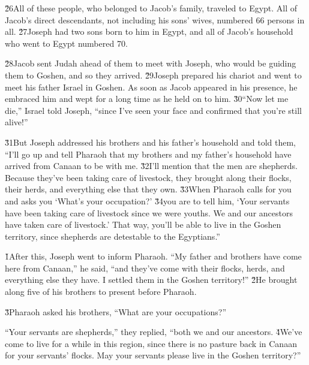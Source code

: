 \v{26}All of these people, who belonged to Jacob's family, traveled to Egypt. All of Jacob's direct descendants, not including his sons' wives, numbered 66 persons in all. \v{27}Joseph had two sons born to him in Egypt, and all of Jacob's household who went to Egypt numbered 70.

\v{28}Jacob sent Judah ahead of them to meet with Joseph, who would be guiding them to Goshen, and so they arrived. \v{29}Joseph prepared his chariot and went to meet his father Israel in Goshen. As soon as Jacob appeared in his presence, he embraced him and wept for a long time as he held on to him. \v{30}``Now let me die,'' Israel told Joseph, ``since I've seen your face and confirmed that you're still alive!''

\v{31}But Joseph addressed his brothers and his father's household and told them, ``I'll go up and tell Pharaoh that my brothers and my father's household have arrived from Canaan to be with me. \v{32}I'll mention that the men are shepherds. Because they've been taking care of livestock, they brought along their flocks, their herds, and everything else that they own. \v{33}When Pharaoh calls for you and asks you `What's your occupation?' \v{34}you are to tell him, `Your servants have been taking care of livestock since we were youths. We and our ancestors have taken care of livestock.' That way, you'll be able to live in the Goshen territory, since shepherds are detestable to the Egyptians.''

\v{1}After this, Joseph went to inform Pharaoh. ``My father and brothers have come here from Canaan,'' he said, ``and they've come with their flocks, herds, and everything else they have. I settled them in the Goshen territory!'' \v{2}He brought along five of his brothers to present before Pharaoh.

\v{3}Pharaoh asked his brothers, ``What are your occupations?''

``Your servants are shepherds,'' they replied, ``both we and our ancestors. \v{4}We've come to live for a while in this region, since there is no pasture back in Canaan for your servants' flocks. May your servants please live in the Goshen territory?''

